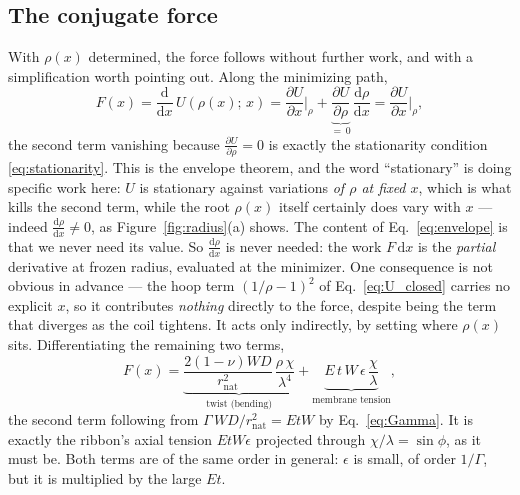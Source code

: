\documentclass[11pt]{article}
\begin{document}
\subsection{The conjugate force}\label{sec:conjugate_force}
With $\rho(x)$ determined, the force follows without further work, and with a
simplification worth pointing out. Along the minimizing path,
\begin{equation}\label{eq:envelope}
    F(x) = \frac{\mathrm d}{\mathrm d x}\,
      U\!\left(\rho(x);\,x\right)
    = \frac{\partial U}{\partial x}\bigg|_{\rho}
      + \underbrace{\frac{\partial U}{\partial \rho}}_{=\,0}\,
        \frac{\mathrm d \rho}{\mathrm d x}
    = \frac{\partial U}{\partial x}\bigg|_{\rho},
\end{equation}
the second term vanishing because $\frac{\partial U}{\partial \rho} = 0$ is
exactly the stationarity condition \eqref{eq:stationarity}. This is the envelope
theorem, and the word ``stationary'' is doing specific work here: $U$ is
stationary against variations \emph{of $\rho$ at fixed $x$}, which is what kills
the second term, while the root $\rho(x)$ itself certainly does vary with $x$ ---
indeed $\frac{\mathrm d \rho}{\mathrm d x} \ne 0$, as Figure~\ref{fig:radius}(a)
shows. The content of Eq.~\eqref{eq:envelope} is that we never need its value. So
$\frac{\mathrm d \rho}{\mathrm d x}$ is never needed: the work
$F\,\mathrm d x$ is the \emph{partial} derivative at frozen radius, evaluated at
the minimizer. One consequence is not obvious in advance --- the hoop term
$\left(1/\rho - 1\right)^{2}$ of Eq.~\eqref{eq:U_closed} carries no explicit $x$,
so it contributes \emph{nothing} directly to the force, despite being the term
that diverges as the coil tightens. It acts only indirectly, by setting where
$\rho(x)$ sits. Differentiating the remaining two terms,
\begin{equation}\label{eq:F_envelope}
    \boxed{\;F(x) =
      \underbrace{\frac{2\left(1-\nu\right)W D}{r_{\mathrm{nat}}^{2}}\,
        \frac{\rho\,\chi}{\lambda^{4}}}_{\text{twist (bending)}}
      + \underbrace{E\,t\,W\,\epsilon\,\frac{\chi}{\lambda}}
        _{\text{membrane tension}},\;}
\end{equation}
the second term following from
$\Gamma\,W D/r_{\mathrm{nat}}^{2} = E t W$ by Eq.~\eqref{eq:Gamma}. It is exactly
the ribbon's axial tension $E t W \epsilon$ projected through
$\chi/\lambda = \sin\phi$, as it must be. Both terms are of the same order in
general: $\epsilon$ is small, of order $1/\Gamma$, but it is multiplied by the
large $E t$.
\end{document}
